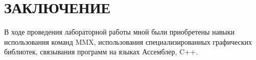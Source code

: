 \section*{ЗАКЛЮЧЕНИЕ}

В ходе проведения лабораторной работы мной были приобретены 
навыки использования команд MMX, 
использования специализированных графических библиотек,
связывания программ на языках Ассемблер, C++. 
\newpage

